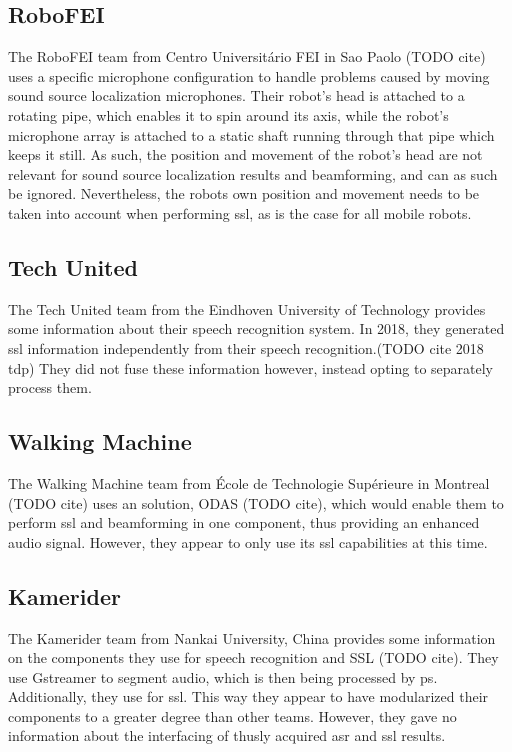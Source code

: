 \subsection{RoboFEI}
The RoboFEI team from Centro Universitário FEI in Sao Paolo (TODO cite) uses a specific microphone configuration to handle problems caused by moving sound source localization microphones.
Their robot's head is attached to a rotating pipe, which enables it to spin around its axis, while the robot's microphone array is attached to a static shaft running through that pipe which keeps it still.
As such, the position and movement of the robot's head are not relevant for sound source localization results and beamforming, and can as such be ignored.
Nevertheless, the robots own position and movement needs to be taken into account when performing \gls{ssl}, as is the case for all mobile robots.

\subsection{Tech United}
The Tech United team from the Eindhoven University of Technology provides some information about their speech recognition system.
In 2018, they generated \gls{ssl} information independently from their speech recognition.(TODO cite 2018 tdp)
They did not fuse these information however, instead opting to separately process them. %


\subsection{Walking Machine}
The Walking Machine team from École de Technologie Supérieure in Montreal (TODO cite) uses an solution, ODAS (TODO cite), which would enable them to perform \gls{ssl} and beamforming in one component, thus providing an enhanced audio signal.
However, they appear to only use its \gls{ssl} capabilities at this time.


\subsection{Kamerider}
The Kamerider team from Nankai University, China provides some information on the components they use for speech recognition and SSL (TODO cite).
They use Gstreamer to segment audio, which is then being processed by \gls{ps}.
Additionally, they use \HARK for \gls{ssl}.
This way they appear to have modularized their components to a greater degree than other teams.
However, they gave no information about the interfacing of thusly acquired \gls{asr} and \gls{ssl} results.


